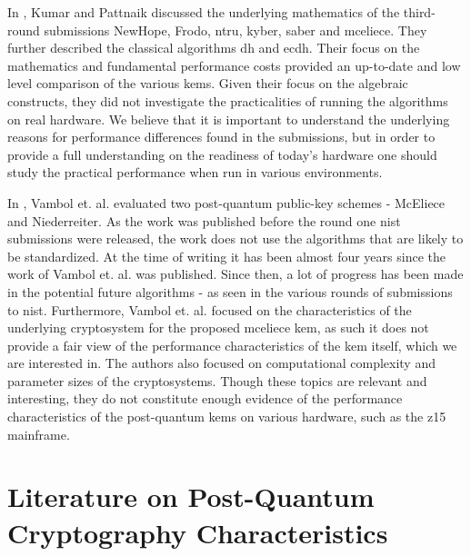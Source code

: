 In \cite{kumar2020}, Kumar and Pattnaik discussed the underlying mathematics of the third-round submissions NewHope, Frodo, \gls{ntru}, \gls{kyber}, \gls{saber} and \gls{mceliece}. They further described the classical algorithms \gls{dh} and \gls{ecdh}. Their focus on the mathematics and fundamental performance costs provided an up-to-date and low level comparison of the various \glspl{kem}. Given their focus on the algebraic constructs, they did not investigate the practicalities of running the algorithms on real hardware. We believe that it is important to understand the underlying reasons for performance differences found in the submissions, but in order to provide a full understanding on the readiness of today's hardware one should study the practical performance when run in various environments.

In \cite{vambol2017}, Vambol et. al. evaluated two \gls{post-quantum} public-key schemes - McEliece and Niederreiter. As the work was published before the round one \gls{nist} submissions were released, the work does not use the algorithms that are likely to be standardized. At the time of writing it has been almost four years since the work of Vambol et. al. was published. Since then, a lot of progress has been made in the potential future algorithms - as seen in the various rounds of submissions to \gls{nist}. Furthermore, Vambol et. al. focused on the characteristics of the underlying cryptosystem for the proposed \gls{mceliece} \gls{kem}, as such it does not provide a fair view of the performance characteristics of the \gls{kem} itself, which we are interested in. The authors also focused on computational complexity and parameter sizes of the cryptosystems. Though these topics are relevant and interesting, they do not constitute enough evidence of the performance characteristics of the \gls{post-quantum} \glspl{kem} on various hardware, such as the \gls{z15} mainframe.

\section{Literature on Post-Quantum Cryptography Characteristics}
\label{section:related-work:post-quantum-characteristics}


